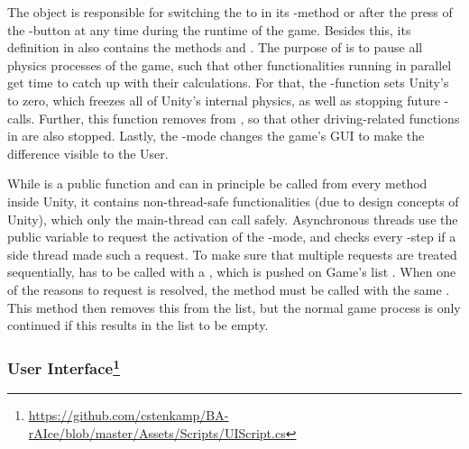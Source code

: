 The object  is responsible for switching the  to  in its -method or after the press of the -button at any time during the runtime of the game. Besides this, its definition in  also contains the methods  and . The purpose of  is to pause all physics processes of the game, such that other functionalities running in parallel get time to catch up with their calculations. For that, the -function sets Unity's  to zero, which freezes all of Unity's internal physics, as well as stopping future -calls. Further, this function removes  from , so that other driving-related functions in  are also stopped. Lastly, the -mode changes the game's GUI to make the difference visible to the User. 

While  is a public function and can in principle be called from every method inside Unity, it contains non-thread-safe functionalities (due to design concepts of Unity), which only the main-thread can call safely. Asynchronous threads use the public variable  to request the activation of the -mode, and  checks every -step if a side thread made such a request. To make sure that multiple requests are treated sequentially,  has to be called with a , which is pushed on Game's list . When one of the reasons to request  is resolved, the method  must be called with the same . This method then removes this  from the list, but the normal game process is only continued if this results in the list to be empty. 

\subsubsection{User Interface\footnote{\label{fn:UI}\url{https://github.com/cstenkamp/BA-rAIce/blob/master/Assets/Scripts/UIScript.cs}}}

